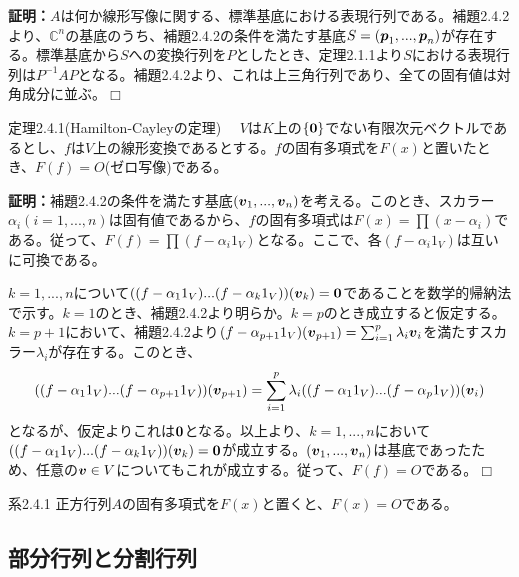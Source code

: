 \documentclass[dvipdfmx, 9pt, a4paper]{jsarticle}
\numberwithin{equation}{subsection}
\newcommand{\bm}[1]{{\mbox{\boldmath $#1$}}}
\def\qed{\hfill $\Box$}
\begin{document}
{\bf 証明：}$A$は何か線形写像に関する、標準基底における表現行列である。補題2.4.2より、$\mathbb{C}^n$の基底のうち、補題2.4.2の条件を満たす基底$S=(\bm p_1, ..., \bm p_n)$が存在する。標準基底から$S$への変換行列を$P$としたとき、定理2.1.1より$S$における表現行列は$P^{-1}AP$となる。補題2.4.2より、これは上三角行列であり、全ての固有値は対角成分に並ぶ。\qed
\begin{itembox}[l]{定理2.4.1(Hamilton-Cayleyの定理)}
　$V$は$K$上の$\{ \bm 0\}$でない有限次元ベクトルであるとし、$f$は$V$上の線形変換であるとする。$f$の固有多項式を$F(x)$と置いたとき、$F(f)=O$(ゼロ写像)である。
\end{itembox}
{\bf 証明：}補題2.4.2の条件を満たす基底$(\bm v_1, ..., \bm v_n)$を考える。このとき、スカラー$\alpha_i(i=1, ..., n)$は固有値であるから、$f$の固有多項式は$F(x)=\prod (x-\alpha_i)$である。従って、$F(f)=\prod (f-\alpha_i1_V)$となる。ここで、各$(f-\alpha_i1_V)$は互いに可換である。\par
$k=1, ..., n$について$((f-\alpha_11_V)...(f-\alpha_k1_V))(\bm v_k)=\bm 0$であることを数学的帰納法で示す。$k=1$のとき、補題2.4.2より明らか。$k=p$のとき成立すると仮定する。$k=p+1$において、補題2.4.2より$(f-\alpha_{p+1}1_V)(\bm v_{p+1})=\sum_{i=1}^p \lambda_i \bm v_i$を満たすスカラー$\lambda_i$が存在する。このとき、
\begin{equation}
((f-\alpha_11_V)...(f-\alpha_{p+1}1_V))(\bm v_{p+1})=\sum_{i=1}^p \lambda_i((f-\alpha_11_V)...(f-\alpha_{p}1_V))(\bm v_i) \notag
\end{equation}
となるが、仮定よりこれは$\bm 0$となる。以上より、$k=1, ..., n$において$((f-\alpha_11_V)...(f-\alpha_k1_V))(\bm v_k)=\bm 0$が成立する。$(\bm v_1, ..., \bm v_n)$は基底であったため、任意の$\bm v \in V$についてもこれが成立する。従って、$F(f)=O$である。\qed
\begin{itembox}[l]{系2.4.1}
正方行列$A$の固有多項式を$F(x)$と置くと、$F(x)=O$である。
\end{itembox}

\subsection{部分行列と分割行列}
\end{document}
